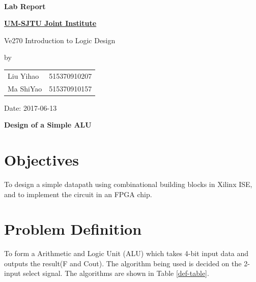 \documentclass{article}
\date{}
\begin{document}
\vspace*{3mm}

\begin{minipage}{0.6\linewidth}
\ 
\end{minipage}
\hfill
\begin{minipage}{0.38\linewidth}
\begin{center}
\huge\bfseries
Lab Report \\[8mm]
\fontsize{100pt}{\baselineskip}
\end{center}
\end{minipage}

\vspace*{1cm}

{\huge\bfseries
\uline{UM-SJTU Joint Institute \phantom{xxxxxxxxxxxx}}
\vspace*{2mm}

Ve270 Introduction to Logic Design
}	

\vspace*{2cm}
\begin{center}
\LARGE
by \\[2mm]
\begin{tabular}{ll}
Liu Yihao & 515370910207 \\
Ma ShiYao & 515370910157
\end{tabular}

\vspace*{2cm}
Date: 2017-06-13
\end{center}

\vspace*{2cm}
\begin{center}
\Huge\bfseries
Design of a Simple ALU
\end{center}

\newpage

\section{Objectives}
To design a simple datapath using combinational building blocks in Xilinx ISE, and to implement the circuit in an FPGA chip.

\section{Problem Definition}
To form a Arithmetic and Logic Unit (ALU) which takes 4-bit input data and outputs the result(F and Cout). The algorithm being used is decided on the 2-input select signal. The algorithms are shown in Table \ref{def-table}.
\end{document}
